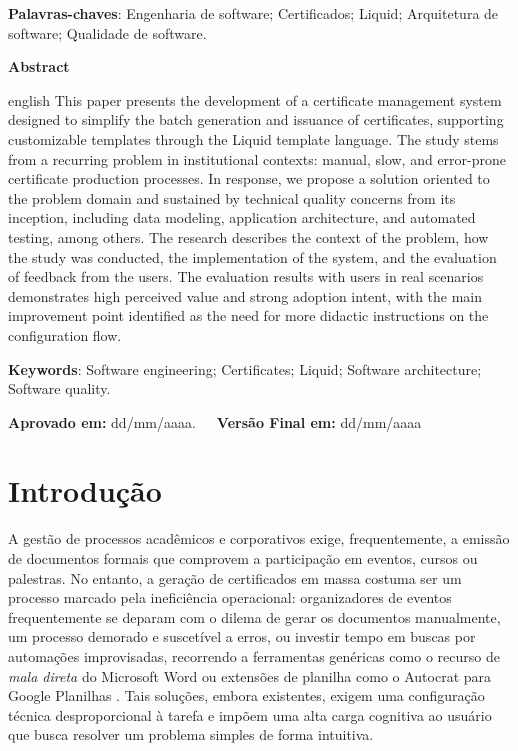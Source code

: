 \documentclass[article,a4paper,12pt,brazil,sumario=tradicional]{abntex2}
\begin{document}
\vspace{.4cm}
 
\noindent
\textbf{Palavras-chaves}: Engenharia de software; Certificados; Liquid; Arquitetura de software; Qualidade de software. 
 
\vspace{\onelineskip}
\begin{center}
    \textbf{Abstract}
\end{center}

\vspace{-.3cm}

\begin{hyphenrules}{english}
\noindent This paper presents the development of a certificate management system designed to simplify the batch generation and issuance of certificates, supporting customizable templates through the Liquid template language. The study stems from a recurring problem in institutional contexts: manual, slow, and error-prone certificate production processes. In response, we propose a solution oriented to the problem domain and sustained by technical quality concerns from its inception, including data modeling, application architecture, and automated testing, among others. The research describes the context of the problem, how the study was conducted, the implementation of the system, and the evaluation of feedback from the users. The evaluation results with users in real scenarios demonstrates high perceived value and strong adoption intent, with the main improvement point identified as the need for more didactic instructions on the configuration flow.

\vspace{.4cm}
\noindent \textbf{Keywords}: Software engineering; Certificates; Liquid; Software architecture; Software quality.
\end{hyphenrules}

\vspace{.8cm} %
\noindent \textbf{Aprovado em:} dd/mm/aaaa.~~~\textbf{Versão Final em:} dd/mm/aaaa

\section{Introdução}

A gestão de processos acadêmicos e corporativos exige, frequentemente, a emissão de documentos formais que comprovem a participação em eventos, cursos ou palestras. No entanto, a geração de certificados em massa costuma ser um processo marcado pela ineficiência operacional: organizadores de eventos frequentemente se deparam com o dilema de gerar os documentos manualmente, um processo demorado e suscetível a erros, ou investir tempo em buscas por automações improvisadas, recorrendo a ferramentas genéricas como o recurso de \textit{mala direta} do Microsoft Word \cite{microsoft2024mailmerge} ou extensões de planilha como o Autocrat para Google Planilhas \cite{autocrat2024}. Tais soluções, embora existentes, exigem uma configuração técnica desproporcional à tarefa e impõem uma alta carga cognitiva ao usuário que busca resolver um problema simples de forma intuitiva.
\end{document}
